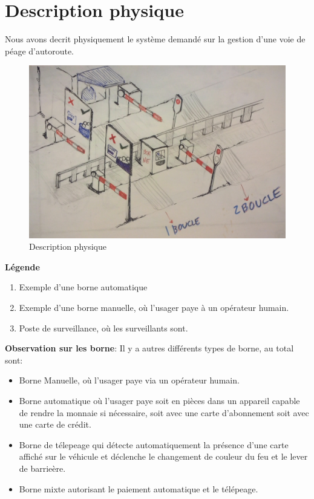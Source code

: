 \label{Cap:TD1}


\section{Description physique}
Nous avons decrit physiquement le système demandé sur la gestion d’une voie de péage d’autoroute.

\begin{figure}[h]
    \centering
    \includegraphics[scale=0.1]{02_Desenvolvimento/TD1/images/desc.png}
    \caption{Description physique}
    \label{fig:my_label}
\end{figure}
\textbf{Légende}
\begin{enumerate}
    \item Exemple d'une borne automatique
    \item Exemple d'une borne manuelle, où l'usager paye à un opérateur humain.
    \item Poste de surveillance, où les surveillants sont.
\end{enumerate}
    \textbf{Observation sur les borne}: Il y a autres différents types de borne, au total sont: 
    \begin{itemize}
        \item Borne Manuelle, où l'usager paye via un opérateur humain.
        \item Borne automatique où l'usager paye soit en pièces dans un appareil capable de rendre la monnaie si nécessaire, soit avec une carte d'abonnement soit avec une carte de crédit.
        \item Borne de télepeage qui détecte automatiquement la présence d'une carte affiché sur le véhicule et déclenche le changement de couleur du feu et le lever de barrieère.
        \item Borne mixte autorisant le paiement automatique et le télépeage.
    \end{itemize}
\newpage
